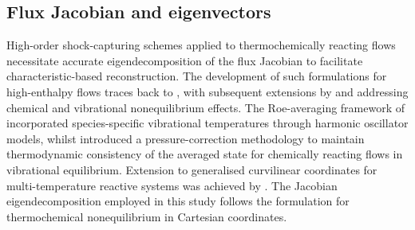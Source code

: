 \subsection{Flux Jacobian and eigenvectors}

High-order shock-capturing schemes applied to thermochemically reacting flows necessitate accurate eigendecomposition of the flux Jacobian to facilitate characteristic-based reconstruction. The development of such formulations for high-enthalpy flows traces back to \citet{Gnoffo1989}, with subsequent extensions by \citet{GrossmanCinnella1990} and \citet{ShuenEtAl1990} addressing chemical and vibrational nonequilibrium effects. The Roe-averaging framework of \citet{GrossmanCinnella1990} incorporated species-specific vibrational temperatures through harmonic oscillator models, whilst \citet{ShuenEtAl1990} introduced a pressure-correction methodology to maintain thermodynamic consistency of the averaged state for chemically reacting flows in vibrational equilibrium. Extension to generalised curvilinear coordinates for multi-temperature reactive systems was achieved by \citet{WangZhong2009}. The Jacobian eigendecomposition employed in this study follows the formulation for thermochemical nonequilibrium in Cartesian coordinates.

